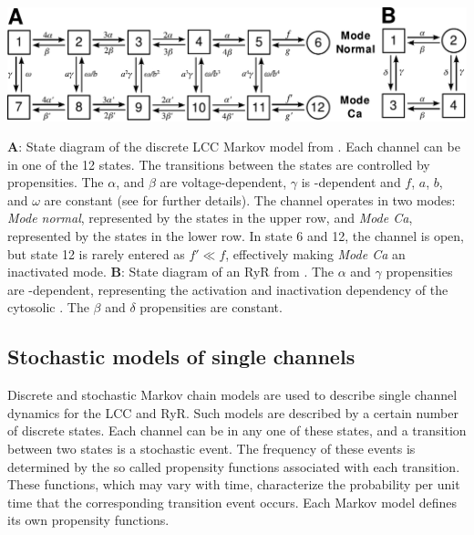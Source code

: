 \begin{figurewithlongcaption}
  \label{fig:hake:markov-models}
  \centering
  \includegraphics[height=\largefig]{chapters/hake/pdf/markov_models}
  \caption[Discrete markov models]{\textbf{A}: State diagram of the
    discrete LCC Markov model from \citet{JafriRiceWinslow1998}. Each
    channel can be in one of the 12 states.  The transitions between
    the states are controlled by propensities. The $\alpha$, and
    $\beta$ are voltage-dependent, $\gamma$ is \CaC-dependent and $f$,
    $a$, $b$, and $\omega$ are constant (see
    \citet{JafriRiceWinslow1998} for further details). The channel
    operates in two modes: \textit{Mode normal}, represented by the
    states in the upper row, and \textit{Mode Ca}, represented by the
    states in the lower row. In state 6 and 12, the channel is open,
    but state 12 is rarely entered as $f'\ll{}f$, effectively making
    \textit{Mode Ca} an inactivated mode.  \textbf{B}: State diagram
    of an RyR from \citet{SternSongEtAl1999}. The $\alpha$ and
    $\gamma$ propensities are \Ca-dependent, representing the
    activation and inactivation dependency of the cytosolic \CaC. The
    $\beta$ and $\delta$ propensities are constant.}
\end{figurewithlongcaption}

\subsection{Stochastic models of single channels}
\label{sec:hake:stochastic-models}
   

Discrete and stochastic Markov chain models are used to describe
single channel dynamics for the LCC and RyR. Such models are described
by a certain number of discrete states. Each channel can be in any one
of these states, and a transition between two states is a stochastic
event. The frequency of these events is determined by the so called
propensity functions associated with each transition. These functions,
which may vary with time, characterize the probability per unit time
that the corresponding transition event occurs. Each Markov model
defines its own propensity functions.

